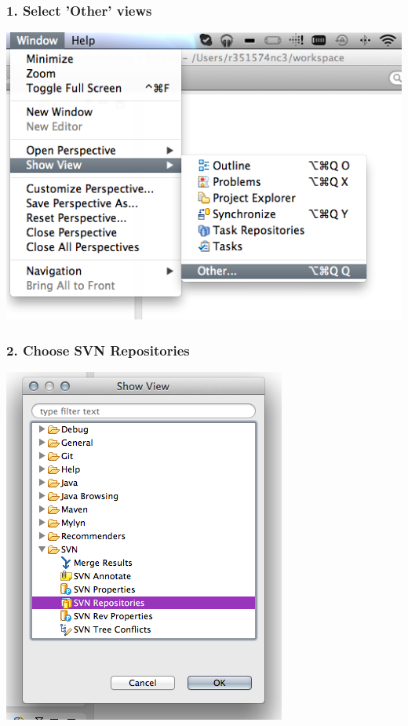 \documentclass[12pt,notitlepage]{article}
\begin{document}
\subsubsection*{1. Select 'Other' views}
\includegraphics[width=\textwidth]{screenshots/Lesson1_2SS5.png}

\subsubsection*{2. Choose SVN Repositories}
\includegraphics[width=\textwidth]{screenshots/Lesson1_2SS6.png}
\end{document}
